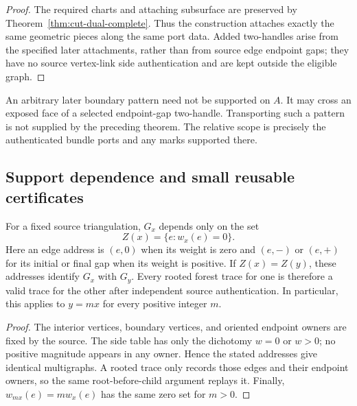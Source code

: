 \begin{proof}
The required charts and attaching subsurface are preserved by
Theorem~\ref{thm:cut-dual-complete}.  Thus the construction attaches exactly
the same geometric pieces along the same port data.  Added two-handles
arise from the specified later attachments, rather than from source edge
endpoint gaps; they have no source vertex-link side authentication and
are kept outside the eligible graph.
\end{proof}

An arbitrary later boundary pattern need not be supported on $A$.  It may
cross an exposed face of a selected endpoint-gap two-handle.  Transporting
such a pattern is not supplied by the preceding theorem.  The relative
scope is precisely the authenticated bundle ports and any marks supported
there.

\subsection{Support dependence and small reusable certificates}

\begin{proposition}
\label{prop:cut-dual-support}
For a fixed source triangulation, $G_x$ depends only on the set
\[
  Z(x)=\{e:w_x(e)=0\}.
\]
Here an edge address is $(e,0)$ when its weight is zero and $(e,-)$ or
$(e,+)$ for its initial or final gap when its weight is positive.  If
$Z(x)=Z(y)$, these addresses identify $G_x$ with $G_y$.  Every rooted
forest trace for one is therefore a valid trace for the other after
independent source authentication.  In particular, this applies to
$y=mx$ for every positive integer $m$.
\end{proposition}

\begin{proof}
The interior vertices, boundary vertices, and oriented endpoint owners
are fixed by the source.  The side table has only the dichotomy $w=0$
or $w>0$; no positive magnitude appears in any owner.  Hence the stated
addresses give identical multigraphs.  A rooted trace only records those
edges and their endpoint owners, so the same root-before-child argument
replays it.  Finally, $w_{mx}(e)=m w_x(e)$ has the same zero set for $m>0$.
\end{proof}

